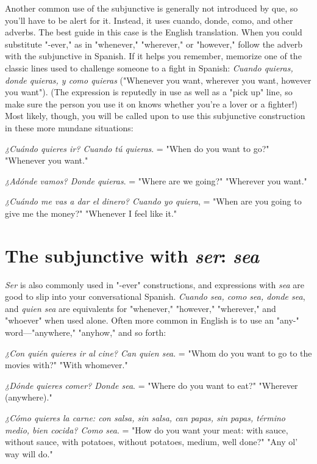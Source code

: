 \documentclass[14pt,a4paper,oneside]{memoir}
\newcommand{\bsk}{\vspace{20pt}}
\newcommand{\indu}{\hspace{20pt}}
\begin{document}
Another common use of the subjunctive is generally not introduced by que, so you'll have to be alert for it. Instead, it uses cuando,
donde, como, and other adverbs. The best guide in this case is the English translation. When you could substitute "-ever," as in "whenever," "wherever," or "however," follow the adverb with the subjunctive
in Spanish. If it helps you remember, memorize one of the classic
lines used to challenge someone to a fight in Spanish: \emph{Cuando quieras,
	donde quieras, y como quieras} ("Whenever you want, wherever you
want, however you want"). (The expression is reputedly in use as well
as a "pick up" line, so make sure the person you use it on knows
whether you're a lover or a fighter!) Most likely, though, you will be
called upon to use this subjunctive construction in these more mundane situations:

\bsk

\indu \emph{¿Cuándo quieres ir? Cuando tú quieras}. = "When do you
want to go?" "Whenever you want."

\indu \emph{¿Adónde vamos? Donde quieras}. = "Where are we going?"
"Wherever you want."

\indu \emph{¿Cuándo me vas a dar el dinero? Cuando yo quiera}, = "When
are you going to give me the money?" "Whenever I
feel like it."

\section{The subjunctive with \emph{ser}: \emph{sea}}

\emph{Ser} is also commonly used in "-ever" constructions, and expressions with \emph{sea} are good to slip into your conversational Spanish.
\emph{Cuando sea, como sea, donde sea}, and \emph{quien sea} are equivalents for
"whenever," "however," "wherever," and "whoever" when used alone.
Often more common in English is to use an "any-" word---"anywhere," "anyhow," and so forth:

\bsk

\indu \emph{¿Con quién quieres ir al cine? Can quien sea}. = "Whom
do you want to go to the movies with?" "With
whomever."

\indu \emph{¿Dónde quieres comer? Donde sea}. = "Where do you want to
eat?" "Wherever (anywhere)."

\indu \emph{¿Cómo quieres la carne: con salsa, sin salsa, can papas, sin
	papas, término medio, bien cocida? Como sea}. =
"How do you want your meat: with sauce, without
sauce, with potatoes, without potatoes, medium, well
done?" "Any ol' way will do."
\end{document}
